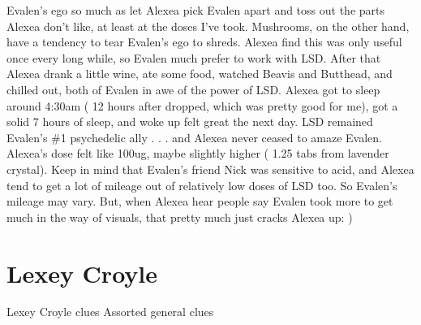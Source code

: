 \documentclass[12pt]{book}
\begin{document}
Evalen's ego so much as let Alexea pick Evalen apart and toss out the parts Alexea don't like, at least at the doses I've took. Mushrooms, on the other hand, have a tendency to tear Evalen's ego to shreds. Alexea find this was only useful once every long while, so Evalen much prefer to work with LSD. After that Alexea drank a little wine, ate some food, watched Beavis and Butthead, and chilled out, both of Evalen in awe of the power of LSD. Alexea got to sleep around 4:30am ( 12 hours after dropped, which was pretty good for me), got a solid 7 hours of sleep, and woke up felt great the next day. LSD remained Evalen's \#1 psychedelic ally . . .  and Alexea never ceased to amaze Evalen. Alexea's dose felt like 100ug, maybe slightly higher ( 1.25 tabs from lavender crystal). Keep in mind that Evalen's friend Nick was sensitive to acid, and Alexea tend to get a lot of mileage out of relatively low doses of LSD too. So Evalen's mileage may vary. But, when Alexea hear people say Evalen took more to get much in the way of visuals, that pretty much just cracks Alexea up: )



\chapter{Lexey Croyle}

Lexey Croyle clues Assorted general clues
\end{document}
